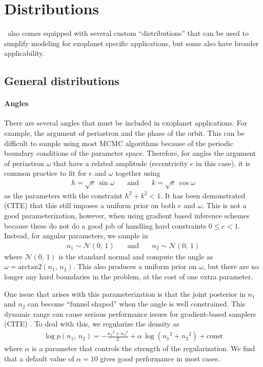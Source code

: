 \documentclass[modern]{aastex62}
\begin{document}
\section{Distributions}

\exoplanet\ also comes equipped with several custom ``distributions'' that can be used to simplify modeling for exoplanet specific applications, but some also have broader applicability.

\subsection{General distributions}

\paragraph{Angles}

There are several angles that must be included in exoplanet applications.
For example, the argument of periastron and the phase of the orbit.
This can be difficult to sample using most MCMC algorithms because of the periodic boundary conditions of the parameter space.
Therefore, for angles the argument of periastron $\omega$ that have a related amplitude (eccentricity $e$ in this case), it is common practice to fit for $e$ and $\omega$ together using
\begin{eqnarray}
h = \sqrt{e}\,\sin \omega & \quad \mathrm{and}\quad & k = \sqrt{e}\,\cos \omega
\end{eqnarray}
as the parameters with the constraint $h^2 + k^2 < 1$.
It has been demonstrated (CITE) that this still imposes a uniform prior on both $e$ and $\omega$.
This is not a good parameterization, however, when using gradient based inference schemes because these do not do a good job of handling hard constraints $0 \le e < 1$.
Instead, for angular parameters, we sample in
\begin{eqnarray}
n_1 \sim \mathcal{N}(0,\,1) & \quad \mathrm{and}\quad & n_2 \sim \mathcal{N}(0,\,1)
\end{eqnarray}
where $\mathcal{N}(0,\,1)$ is the standard normal and compute the angle as $\omega = \mathrm{arctan2}(n_1,\,n_2)$.
This also produces a uniform prior on $\omega$, but there are no longer any hard boundaries in the problem, at the cost of one extra parameter.

One issue that arises with this parameterization is that the joint posterior in $n_1$ and $n_2$ can become ``funnel shaped'' when the angle is well constrained.
This dynamic range can cause serious performance issues for gradient-based samplers (CITE)
.
To deal with this, we regularize the density as
\begin{eqnarray}
\log p (n_1,\,n_2) = -\frac{{n_1}^2 + {n_2}^2}{2} + \alpha\,\log({n_1}^2 + {n_2}^2) + \mathrm{const}
\end{eqnarray}
where $\alpha$ is a parameter that controls the strength of the regularization.
We find that a default value of $\alpha = 10$ gives good performance in most cases.
\end{document}
